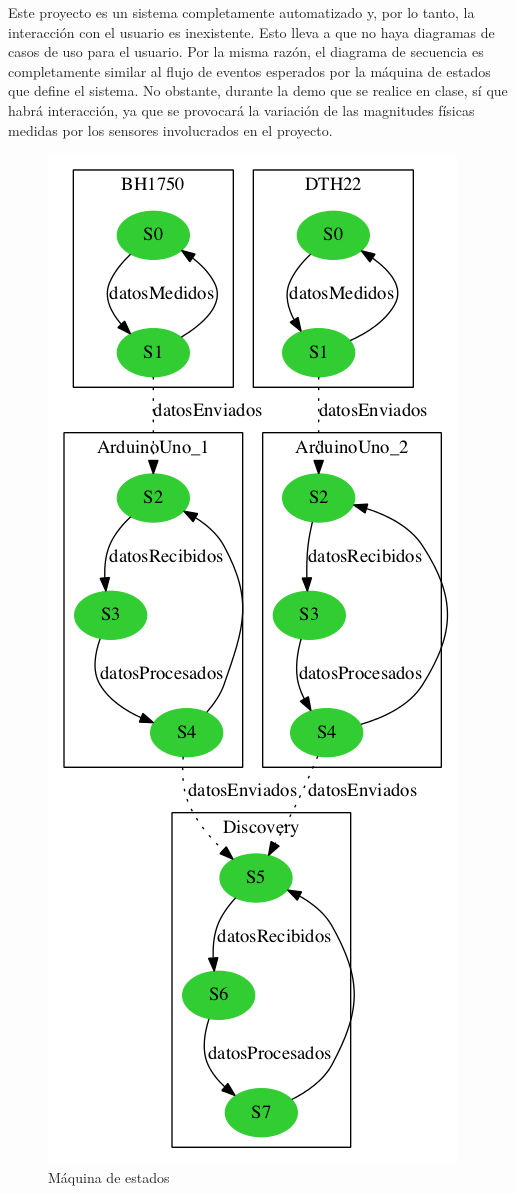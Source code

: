 Este proyecto es un sistema completamente automatizado y, por lo
tanto, la interacci\'on con el usuario es inexistente. Esto lleva a
que no haya diagramas de casos de uso para el usuario. Por la misma
raz\'on, el diagrama de secuencia es completamente similar al flujo de
eventos esperados por la m\'aquina de estados que define el sistema.
No obstante, durante la demo que se realice en clase, s\'i que habr\'a
interacci\'on, ya que se provocar\'a la variaci\'on de las magnitudes
f\'isicas medidas por los sensores involucrados en el proyecto.
\begin{center}
\begin{figure}[h]\label{fig:statemachine}
\hspace{3.5cm}
\includegraphics[scale=0.5]{images/maquina_estados.png}
\caption{M\'aquina de estados}
\end{figure}
\end{center}
